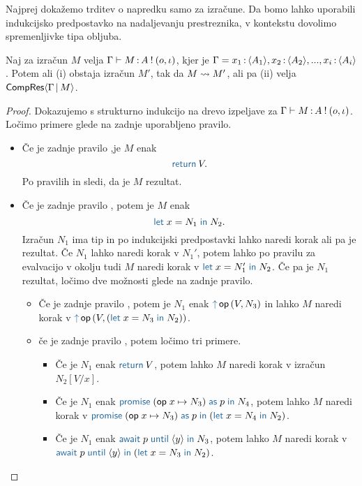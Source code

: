 Najprej dokažemo trditev o napredku samo za izračune. Da bomo lahko uporabili indukcijsko predpostavko na nadaljevanju prestreznika, v kontekstu dovolimo spremenljivke tipa obljuba.

\begin{trditev}[o napredku]\label{trd:gamma-napredek}
	Naj za izračun $M$ velja $\Gamma \vdash M \mathinner{:} A \mathbin{!} (o, \iota)$, kjer je $\Gamma = x_1 \mathinner{:} \langle A_1 \rangle, x_2 \mathinner{:} \langle A_2 \rangle,..., x_i \mathinner{:} \langle A_i \rangle$. Potem ali (i) obstaja izračun $M'$, tak da $M \leadsto M'$, ali pa (ii) velja $\mathsf{CompRes}\langle\Gamma \,\vert\, M\rangle$.
\end{trditev}

\begin{proof}
	Dokazujemo s strukturno indukcijo na drevo izpeljave za $\Gamma \vdash M \mathinner{:} A \mathbin{!} (o, \iota)$.
	Ločimo primere glede na zadnje uporabljeno pravilo.
	
	\begin{itemize}
		\item Če je zadnje pravilo ,je $M$ enak $$\tmreturn{V}.$$
		Po pravilih  in  sledi, da je $M$ rezultat.
		
		\item Če je zadnje pravilo , potem je $M$ enak $$\tmlet{x}{N_1}{N_2}.$$
		Izračun $N_1$ ima tip in po indukcijski predpostavki lahko naredi korak ali pa je rezultat. Če $N_1$ lahko naredi korak v $N_1'$, potem lahko po pravilu za evalvacijo v okolju tudi $M$ naredi korak v $\tmlet{x}{N_1'}{N_2}$.
		Če pa je $N_1$ rezultat, ločimo dve možnosti glede na zadnje pravilo. 
		\begin{itemize}
			\item Če je zadnje pravilo , potem je $N_1$ enak $\tmopout{op}{V}{N_3}$ in lahko $M$ naredi korak v $\tmopout{op}{V}{(\tmlet{x}{N_3}{N_2})}$.
			\item če je zadnje pravilo , potem ločimo tri primere.
			\begin{itemize}
				\item Če je $N_1$ enak $\tmreturn{V}$, potem lahko $M$ naredi korak v izračun $N_2[V/x]$.
				\item Če je $N_1$ enak $\tmwith{op}{x}{N_3}{p}{N_4}$, potem lahko $M$ naredi korak v $\tmwith{op}{x}{N_3}{p}{(\tmlet{x}{N_4}{N_2})}$.
				\item Če je $N_1$ enak $\tmawait{p}{y}{N_3}$, potem lahko $M$ naredi korak v $\tmawait{p}{y}{(\tmlet{x}{N_3}{N_2})}$.
			\end{itemize}
			

\end{itemize}
\end{itemize}
\end{proof}
